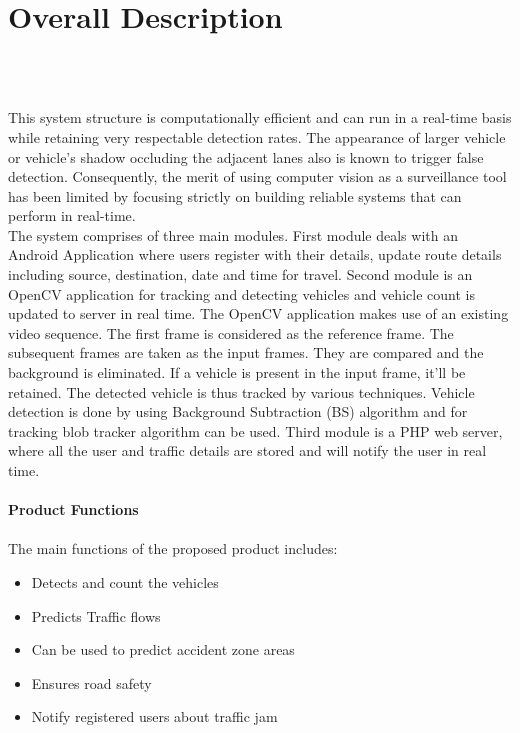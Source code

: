 \section{Overall Description}
\\
\\
\par This system structure is computationally efficient and can run in a real-time basis while retaining very respectable detection rates. The appearance of larger vehicle or vehicle's shadow occluding the adjacent lanes also is known to trigger false detection. Consequently, the merit of using computer vision as a surveillance tool has been limited by focusing strictly on building reliable systems that can perform in real-time.\\

The system comprises of three main modules. First module deals with an Android Application where users register with their details, update route details including source, destination, date and time for travel. Second module is an OpenCV application for tracking and detecting vehicles and vehicle count is updated to server in real time. The OpenCV application makes use of an existing video sequence. The first frame is considered as the reference frame. The subsequent frames are taken as the input frames. They are compared and the background is eliminated. If a vehicle is present in the input frame, it’ll be retained. The detected vehicle is thus tracked by various techniques. Vehicle detection is done by using Background Subtraction (BS) algorithm and for tracking blob tracker algorithm can be used. Third module is a PHP web server, where all the user and traffic details are stored and will notify the user in real time.  \\	
\\
\textbf{Product Functions}
\\
\\
The main functions of the proposed product includes:\\ 
\begin{itemize}
\item Detects and count the vehicles
\item Predicts Traffic flows
\item Can be used to predict accident zone areas
\item Ensures road safety
\item Notify registered users about traffic jam
\\
\end{itemize}
